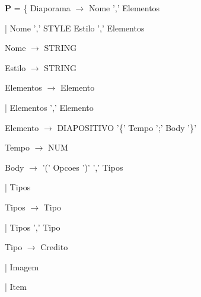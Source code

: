 \documentclass[11pt,a4paper]{report}
\begin{document}
\vspace{0.5cm}

\textbf{P} = \{ Diaporama $\rightarrow$ Nome ',' Elementos

\vspace{0.2cm}
\hspace{3.15cm} | Nome ',' STYLE Estilo ',' Elementos

\vspace{0.2cm}
\hspace{1.0cm} Nome $\rightarrow$ STRING

\vspace{0.2cm}
\hspace{1.0cm} Estilo $\rightarrow$ STRING

\vspace{0.2cm}
\hspace{1.0cm} Elementos $\rightarrow$ Elemento

\vspace{0.2cm}
\hspace{3.05cm} | Elementos ',' Elemento

\vspace{0.2cm}
\hspace{1.0cm} Elemento $\rightarrow$ DIAPOSITIVO '\{' Tempo ';' Body '\}'

\vspace{0.2cm}
\hspace{1.0cm} Tempo $\rightarrow$ NUM

\vspace{0.2cm}
\hspace{1.0cm} Body $\rightarrow$ '(' Opcoes ')' ',' Tipos

\vspace{0.2cm}
\hspace{2.3cm} | Tipos

\vspace{0.2cm}
\hspace{1.0cm} Tipos $\rightarrow$ Tipo

\vspace{0.2cm}
\hspace{2.3cm} | Tipos ',' Tipo

\vspace{0.2cm}
\hspace{1.0cm} Tipo $\rightarrow$ Credito

\vspace{0.2cm}
\hspace{2.2cm} | Imagem

\vspace{0.2cm}
\hspace{2.2cm} | Item
\end{document}
